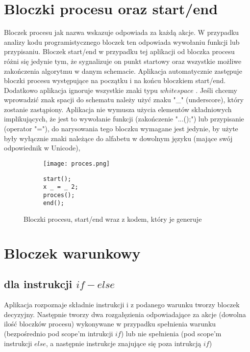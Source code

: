 \section{Bloczki procesu oraz start/end}
	Bloczek procesu jak nazwa wskazuje odpowiada za każdą akcje. W przypadku analizy kodu programistycznego bloczek ten odpowiada wywołaniu funkcji lub przypisaniu. Bloczek start/end w przypadku tej aplikacji od bloczka procesu różni się jedynie tym, że sygnalizuje on punkt startowy oraz wszystkie możliwe zakończenia algorytmu w danym schemacie. Aplikacja automatycznie zastępuje bloczki procesu występujące na początku i na końcu bloczkiem start/end. Dodatkowo aplikacja ignoruje wszystkie znaki typu $whitespace$ . Jeśli chcemy wprowadzić znak spacji do schematu należy użyć znaku "\_" (underscore), który zostanie zastąpiony. Aplikacja nie wymusza użycia elementów składniowych implikujących, że jest to wywołanie funkcji (zakończenie "...();") lub przypisanie (operator "="), do narysowania tego bloczku wymagane jest jedynie, by użyte były wyłącznie znaki należące do alfabetu w dowolnym języku (mające swój odpowiednik w Unicode),  
	
	\begin{figure}[H]
  \begin{subfigure}[t]{0.49\textwidth}
    \vspace{0pt}
    \texttt{[image: proces.png]}
  \end{subfigure}\hfill
  \begin{subfigure}[t]{0.49\textwidth}
    \begin{verbatim}
start();
x _ = _ 2;
proces();
end();
    \end{verbatim}
  \end{subfigure}%
  \caption{Bloczki procesu, start/end wraz z kodem, który je generuje}
\end{figure}

\section{Bloczek warunkowy}
	\subsection{dla instrukcji $if-else$}	
	
		Aplikacja rozpoznaje składnie instrukcji i z podanego warunku tworzy bloczek decyzyjny. Następnie tworzy dwa rozgałęzienia odpowiadające za akcje (dowolna ilość bloczków procesu) wykonywane w przypadku spełnienia warunku (bezpośrednio pod scope'm intrukcji $if$) lub nie spełnienia (pod scope'm instrukcji $else$, a następnie instrukcje znajujące się poza intrukcją $if$) 
		
